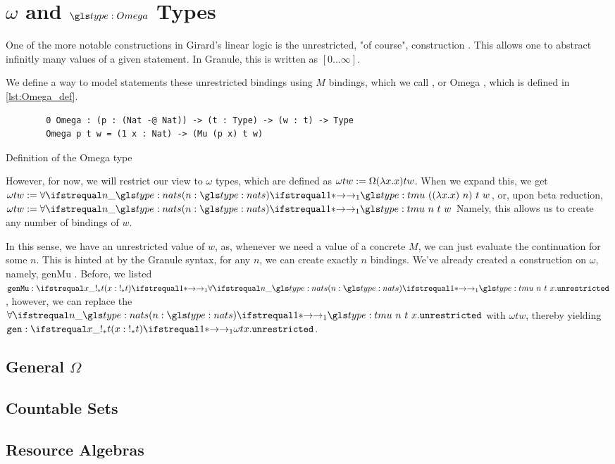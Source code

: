 \section{$\omega$ and $\tomega$ Types}

One of the more notable constructions in Girard's linear logic is the unrestricted, "of course", construction \cite{linear_logic}.
This allows one to abstract infinitly many values of a given statement.
In Granule, this is written as $[0 \dots \infty]$.

We define a way to model statements these unrestricted bindings using $M$ bindings, which we call \tomega, or \ident Omega , which is defined in \ref{lst:Omega_def}. 

\begin{listing}
	\begin{verbatim}
		0 Omega : (p : (Nat -@ Nat)) -> (t : Type) -> (w : t) -> Type
		Omega p t w = (1 x : Nat) -> (Mu (p x) t w)
	\end{verbatim}
	\caption{Definition of the Omega type}
	\label{lst:Omega_def}
\end{listing}

However, for now, we will restrict our view to $\omega$ types, which are defined as $\omega t w := \Omega (\lambda x . x) t w$.
When we expand this, we get $\omega t w \deq \eomega{(\lambda x . x)}{t}{w}$, or, upon beta reduction, $\omega t w \deq \fa1 n : \nat . {\tm n t w}$
Namely, this allows us to create any number of bindings of $w$.

In this sense, we have an unrestricted value of $w$, as, whenever we need a value of a concrete $M$, we can just evaluate the continuation for some $n$.
This is hinted at by the Granule syntax, for any $n$, we can create exactly $n$ bindings.
We've already created a construction on $\omega$, namely, \ident genMu .
Before, we listed $\ident genMu : \fn1 x : {!_* t} . \fa1 n : \nat . {\tm n t x.{\ident unrestricted }}$, however, we can replace the $\fa1 n : \nat . {\tm n t x.{\ident unrestricted }}$ with $\omega t w$, thereby yielding $\ident gen : \fn1 x : {!_* t} . \omega t {x.{\ident unrestricted }}$.

\subsection{General $\Omega$}

\subsection{Countable Sets}


\subsection{Resource Algebras}
